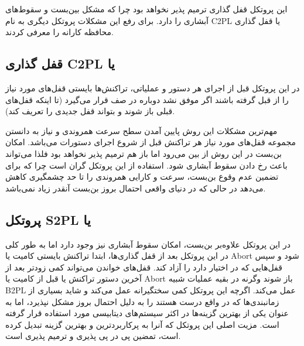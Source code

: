 \documentclass[a4paper]{article}
\begin{document}
این پروتکل قفل گذاری ترمیم پذیر نخواهد بود چرا که مشکل بین‌بست و سقوط‌های آبشاری
را دارد. برای رفع این مشکلات پروتکل دیگری به نام C2PL یا قفل گذاری محافظه کارانه
را معرفی کردند.

\subsection{قفل گذاری C2PL یا }

در این پروتکل قبل از اجرای هر دستور و عملیاتی، تراکنش‌ها بایستی قفل‌های مورد
نیاز را از قبل گرفته باشند اگر موفق نشد دوباره در صف قرار می‌گیرد (تا اینکه
قفل‌های قبلی باز شوند و بتواند قفل جدیدی را تعریف کند).

\begin{LTR}
    \begin{table}[h]
        \begin{RTL}
            \caption{زمانبندی $S_{7}$}
        \end{RTL}
        \centering
    \end{table}
\end{LTR}

مهم‌ترین مشکلات این روش پایین آمدن سطح سرعت همروندی و نیاز به دانستن مجموعه
قفل‌های مورد نیاز هر تراکنش قبل از شروع اجرای دستورات می‌باشد. امکان بن‌بست در
این روش از بین می‌رود اما باز هم ترمیم پذیر نخواهد بود فلذا می‌تواند باعث رخ
دادن سقوط آبشاری شود. استفاده از این پروتکل گران است چرا که برای تضمین عدم وقوع
بن‌بست، سرعت و کارایی همروندی را تا حد چشمگیری کاهش می‌دهد در حالی که در دنیای
واقعی احتمال بروز بن‌بست آنقدر زیاد نمی‌باشد.

\newpage

\subsection{پروتکل S2PL یا }

در این پروتکل علاوه‌بر بن‌بست، امکان سقوط آبشاری نیز وجود دارد اما به طور کلی در
این پروتکل بعد از قفل گذاری‌ها، ابتدا تراکنش بایستی کامیت یا Abort شود و سپس
قفل‌هایی که در اختیار دارد را آزاد کند. قفل‌های خواندن می‌تواند کمی زودتر بعد از
آخرین دستور تراکنش یا قبل از کامیت یا Abort باز شوند وگرنه در بقیه عملیات شبیه
B2PL عمل می‌کند. اگرچه این پروتکل کمی سختگیرانه عمل می‌کند و شاید بسیاری از
زمانبندی‌ها که در واقع درست هستند را به دلیل احتمال بروز مشکل نپذیرد، اما به
عنوان یکی از بهترین گزینه‌ها در اکثر سیستم‌های دیتابیسی مورد استفاده قرار گرفته
است. مزیت اصلی این پروتکل که آنرا به پرکاربردترین و بهترین گزینه تبدیل کرده است،
تمضین پی در پی پذیری و ترمیم پذیری است.
\end{document}
